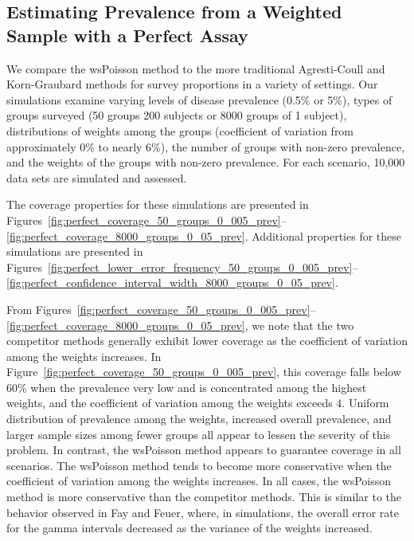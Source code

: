 \documentclass[AMA,STIX1COL]{WileyNJD-v2}
\begin{document}
\subsection{Estimating Prevalence from a Weighted Sample with a Perfect Assay}

We compare the wsPoisson method to the more traditional Agresti-Coull and Korn-Graubard methods for survey proportions in a variety of settings.
Our simulations examine varying levels of disease prevalence (0.5\% or 5\%), types of groups surveyed (50 groups 200 subjects or 8000 groups of 1 subject), distributions of weights among the groups (coefficient of variation from approximately 0\% to nearly 6\%), the number of groups with non-zero prevalence, and the weights of the groups with non-zero prevalence.
For each scenario, 10,000 data sets are simulated and assessed.


The coverage properties for these simulations are presented in Figures~\ref{fig:perfect_coverage_50_groups_0_005_prev}--\ref{fig:perfect_coverage_8000_groups_0_05_prev}.
Additional properties for these simulations are presented in Figures~\ref{fig:perfect_lower_error_frequency_50_groups_0_005_prev}--\ref{fig:perfect_confidence_interval_width_8000_groups_0_05_prev}.

From Figures~\ref{fig:perfect_coverage_50_groups_0_005_prev}--\ref{fig:perfect_coverage_8000_groups_0_05_prev}, we note that the two competitor methods generally exhibit lower coverage as the coefficient of variation among the weights increases.
In Figure~\ref{fig:perfect_coverage_50_groups_0_005_prev}, this coverage falls below 60\% when the prevalence very low and is concentrated among the highest weights, and the coefficient of variation among the weights exceeds 4.
Uniform distribution of prevalence among the weights, increased overall prevalence, and larger sample sizes among fewer groups all appear to lessen the severity of this problem.
In contrast, the wsPoisson method appears to guarantee coverage in all scenarios. The wsPoisson method tends to become more conservative when the coefficient of variation among the weights increases. 
In all cases, the wsPoisson method is more conservative than the competitor methods.
This is similar to the behavior observed in Fay and Feuer\cite{FayF:1997}, where, in simulations, the overall error rate for the gamma intervals decreased as the variance of the weights increased.
\end{document}
